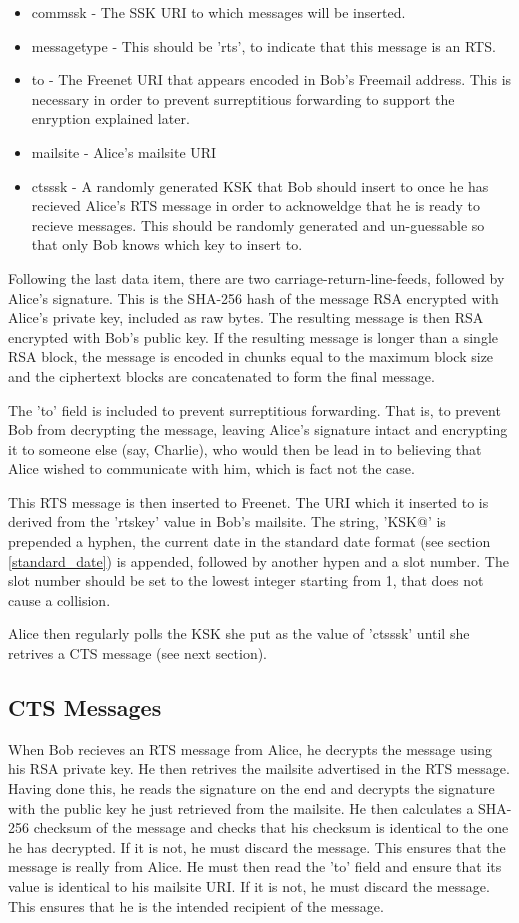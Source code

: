 \documentclass[12pt,a4paper]{article}
\begin{document}
\begin{itemize}
\item commssk - The SSK URI to which messages will be inserted.
\item messagetype - This should be 'rts', to indicate that this message is an RTS.
\item to - The Freenet URI that appears encoded in Bob's Freemail address. This is necessary in order to prevent surreptitious forwarding to support the enryption explained later.
\item mailsite - Alice's mailsite URI
\item ctsssk - A randomly generated KSK that Bob should insert to once he has recieved Alice's RTS message in order to acknoweldge that he is ready to recieve messages. This should be randomly generated and un-guessable so that only Bob knows which key to insert to.
\end{itemize}

Following the last data item, there are two carriage-return-line-feeds, followed by Alice's signature. This is the SHA-256 hash of the message RSA encrypted with Alice's private key, included as raw bytes. The resulting message is then RSA encrypted with Bob's public key. If the resulting message is longer than a single RSA block, the message is encoded in chunks equal to the maximum block size and the ciphertext blocks are concatenated to form the final message.

The 'to' field is included to prevent surreptitious forwarding. That is, to prevent Bob from decrypting the message, leaving Alice's signature intact and encrypting it to someone else (say, Charlie), who would then be lead in to believing that Alice wished to communicate with him, which is fact not the case.

This RTS message is then inserted to Freenet. The URI which it inserted to is derived from the 'rtskey' value in Bob's mailsite. The string, 'KSK@' is prepended a hyphen, the current date in the standard date format (see section \ref{standard_date}) is appended, followed by another hypen and a slot number. The slot number should be set to the lowest integer starting from 1, that does not cause a collision.

Alice then regularly polls the KSK she put as the value of 'ctsssk' until she retrives a CTS message (see next section).

\subsection{CTS Messages}
When Bob recieves an RTS message from Alice, he decrypts the message using his RSA private key. He then retrives the mailsite advertised in the RTS message. Having done this, he reads the signature on the end and decrypts the signature with the public key he just retrieved from the mailsite. He then calculates a SHA-256 checksum of the message and checks that his checksum is identical to the one he has decrypted. If it is not, he must discard the message. This ensures that the message is really from Alice. He must then read the 'to' field and ensure that its value is identical to his mailsite URI. If it is not, he must discard the message. This ensures that he is the intended recipient of the message.
\end{document}
